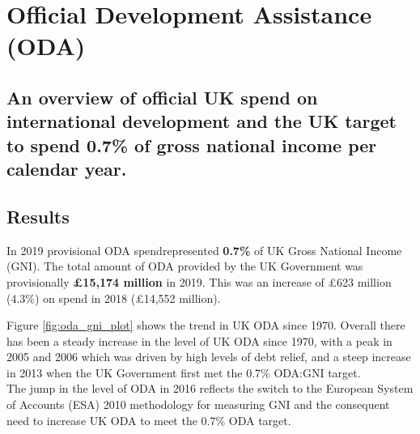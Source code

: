 \chapter{Official Development Assistance (ODA)}

\section*{An overview of official UK spend on international development and the UK target to spend 0.7\% of gross national income per calendar year.}

\bigskip
\bigskip

\thispagestyle{empty}

\section{Results}

In 2019 provisional ODA spend\footnotemark represented \textbf{0.7\%} of UK Gross National Income (GNI). %
The total amount of ODA provided by the UK Government was provisionally \textbf{\pounds 15,174 million} in 2019. %
This was an increase of \pounds 623 million (4.3\%) on spend in 2018 (\pounds 14,552 million). \\%


Figure \ref{fig:oda_gni_plot} shows the trend in UK ODA since 1970. %
Overall there has been a steady increase in the level of UK ODA since 1970, with a peak in 2005 and 2006 which was driven by high levels of debt relief, and a steep increase in 2013 when the UK Government first met the 0.7\% ODA:GNI target. \\%

The jump in the level of ODA in 2016 reflects the switch to the European System of Accounts (ESA) 2010 methodology for measuring GNI and the consequent need to increase UK ODA to meet the 0.7\% ODA target. %


